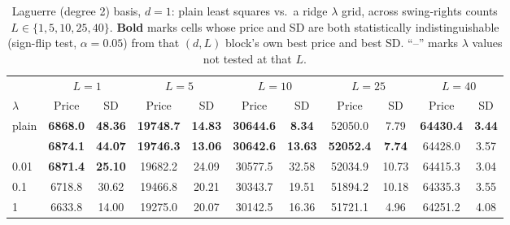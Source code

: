 \begin{table}[htbp]
\caption{\label{tab:laguerre_ridge_lambda_L_sweep_d1}Laguerre (degree 2) basis, $d=1$: plain least squares vs.\ a ridge $\lambda$ grid, across swing-rights counts $L \in \{1,5,10,25,40\}$. \textbf{Bold} marks cells whose price and SD are both statistically indistinguishable (sign-flip test, $\alpha=0.05$) from that $(d,L)$ block's own best price and best SD. ``--'' marks $\lambda$ values not tested at that $L$.}
\scriptsize
\setlength{\tabcolsep}{3pt}
\centering
\begin{tabular}[t]{lcccccccccc}
\toprule
\multicolumn{1}{c}{ } & \multicolumn{2}{c}{$L = 1$} & \multicolumn{2}{c}{$L = 5$} & \multicolumn{2}{c}{$L = 10$} & \multicolumn{2}{c}{$L = 25$} & \multicolumn{2}{c}{$L = 40$} \\
\cmidrule(l{3pt}r{3pt}){2-3} \cmidrule(l{3pt}r{3pt}){4-5} \cmidrule(l{3pt}r{3pt}){6-7} \cmidrule(l{3pt}r{3pt}){8-9} \cmidrule(l{3pt}r{3pt}){10-11}
$\lambda$ & Price & SD & Price & SD & Price & SD & Price & SD & Price & SD\\
\midrule
plain & \textbf{6868.0} & \textbf{48.36} & \textbf{19748.7} & \textbf{14.83} & \textbf{30644.6} & \textbf{8.34} & 52050.0 & 7.79 & \textbf{64430.4} & \textbf{3.44}\\
\addlinespace
0.001 & \textbf{6874.1} & \textbf{44.07} & \textbf{19746.3} & \textbf{13.06} & \textbf{30642.6} & \textbf{13.63} & \textbf{52052.4} & \textbf{7.74} & 64428.0 & 3.57\\
0.01 & \textbf{6871.4} & \textbf{25.10} & 19682.2 & 24.09 & 30577.5 & 32.58 & 52034.9 & 10.73 & 64415.3 & 3.04\\
0.1 & 6718.8 & 30.62 & 19466.8 & 20.21 & 30343.7 & 19.51 & 51894.2 & 10.18 & 64335.3 & 3.55\\
1 & 6633.8 & 14.00 & 19275.0 & 20.07 & 30142.5 & 16.36 & 51721.1 & 4.96 & 64251.2 & 4.08\\
\bottomrule
\end{tabular}
\end{table}

